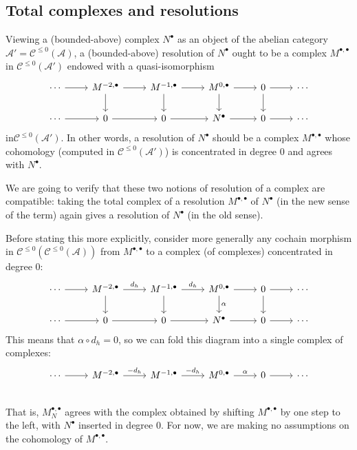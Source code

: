 \subsection{Total complexes and resolutions}
Viewing a (bounded-above) complex $N^\bullet$ as an object of the abelian category $\mathcal{A}'=\mathcal{C}^{\leq0}(\mathcal{A})$, a (bounded-above) resolution of $N^\bullet$ ought to be a complex $M^{\bullet,\bullet}$ in $\mathcal{C}^{\leq0}(\mathcal{A}')$ endowed with a quasi-isomorphism
\[\begin{tikzcd}
\cdots\ar[r]&M^{-2,\bullet}\ar[d]\ar[r]&M^{-1,\bullet}\ar[d]\ar[r]&M^{0,\bullet}\ar[r]\ar[d]&0\ar[d]\ar[r]&\cdots\\
\cdots\ar[r]&0\ar[r]&0\ar[r]&N^\bullet\ar[r]&0\ar[r]&\cdots
\end{tikzcd}\]
in$\mathcal{C}^{\leq0}(\mathcal{A}')$. In other words, a resolution of $N^\bullet$ should be a complex $M^{\bullet,\bullet}$ whose cohomology (computed in $\mathcal{C}^{\leq0}(\mathcal{A}')$) is concentrated in degree $0$ and agrees with $N^\bullet$.\par
We are going to verify that these two notions of resolution of a complex are compatible: taking the total complex of a resolution $M^{\bullet,\bullet}$ of $N^\bullet$ (in the new sense of the term) again gives a resolution of $N^\bullet$ (in the old sense).\par
Before stating this more explicitly, consider more generally any cochain morphism in $\mathcal{C}^{\leq0}(\mathcal{C}^{\leq0}(\mathcal{A}))$ from $M^{\bullet,\bullet}$ to a complex (of complexes) concentrated in degree $0$:
\[\begin{tikzcd}
\cdots\ar[r]&M^{-2,\bullet}\ar[d]\ar[r,"d_h"]&M^{-1,\bullet}\ar[d]\ar[r,"d_h"]&M^{0,\bullet}\ar[r]\ar[d,"\alpha"]&0\ar[d]\ar[r]&\cdots\\
\cdots\ar[r]&0\ar[r]&0\ar[r]&N^\bullet\ar[r]&0\ar[r]&\cdots
\end{tikzcd}\]
This means that $\alpha\circ d_h=0$, so we can fold this diagram into a single complex of complexes:
\[\begin{tikzcd}
\cdots\ar[r]&M^{-2,\bullet}\ar[r,"-d_h"]&M^{-1,\bullet}\ar[r,"-d_h"]&M^{0,\bullet}\ar[r,"\alpha"]&0\ar[r]&\cdots\\
\end{tikzcd}\]
That is, $M^{\bullet,\bullet}_N$ agrees with the complex obtained by shifting $M^{\bullet,\bullet}$ by one step to the left, with $N^\bullet$ inserted in degree $0$. For now, we are making no assumptions on
the cohomology of $M^{\bullet,\bullet}$.\par
